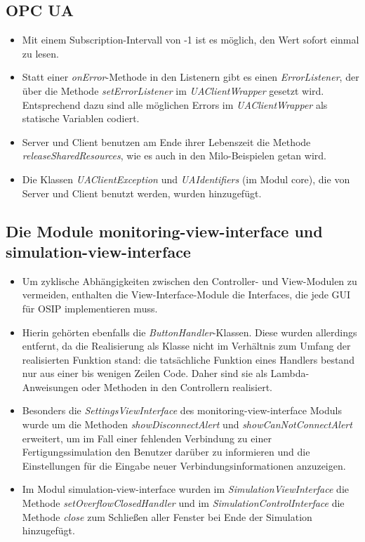 \documentclass[parskip=full]{scrartcl}
\begin{document}
\subsection{OPC UA}
\begin{itemize}
 \item Mit einem Subscription-Intervall von -1 ist es möglich, den Wert sofort einmal zu lesen.
 \item Statt einer \emph{onError}-Methode in den Listenern gibt es einen \emph{ErrorListener}, der über die Methode \emph{setErrorListener} im \emph{UAClientWrapper} gesetzt wird. Entsprechend dazu sind alle möglichen Errors im \emph{UAClientWrapper} als statische Variablen codiert.
 \item Server und Client benutzen am Ende ihrer Lebenszeit die Methode \emph{releaseSharedResources}, wie es auch in den Milo-Beispielen getan wird.
 \item Die Klassen \emph{UAClientException} und \emph{UAIdentifiers} (im Modul core), die von Server und Client benutzt werden, wurden hinzugefügt.
\end{itemize}

\subsection{Die Module monitoring-view-interface und simulation-view-interface}
\begin{itemize}
 \item Um zyklische Abhängigkeiten zwischen den Controller- und View-Modulen zu vermeiden, enthalten die View-Interface-Module die Interfaces, die jede GUI für OSIP implementieren muss.
 \item Hierin gehörten ebenfalls die \emph{ButtonHandler}-Klassen. Diese wurden allerdings entfernt, da die Realisierung als Klasse nicht im Verhältnis zum Umfang der realisierten Funktion stand: die tatsächliche Funktion eines Handlers bestand nur aus einer bis wenigen Zeilen Code. Daher sind sie als Lambda-Anweisungen oder Methoden in den Controllern realisiert.
 \item Besonders die \emph{SettingsViewInterface} des monitoring-view-interface Moduls wurde um die Methoden \emph{showDisconnectAlert} und \emph{showCanNotConnectAlert} erweitert, um im Fall einer fehlenden Verbindung zu einer Fertigungssimulation den Benutzer darüber zu informieren und die Einstellungen für die Eingabe neuer Verbindungsinformationen anzuzeigen.
 \item Im Modul simulation-view-interface wurden im \emph{SimulationViewInterface} die Methode \emph{setOverflowClosedHandler} und im \emph{SimulationControlInterface} die Methode \emph{close} zum Schließen aller Fenster bei Ende der Simulation hinzugefügt.
\end{itemize}
\end{document}
